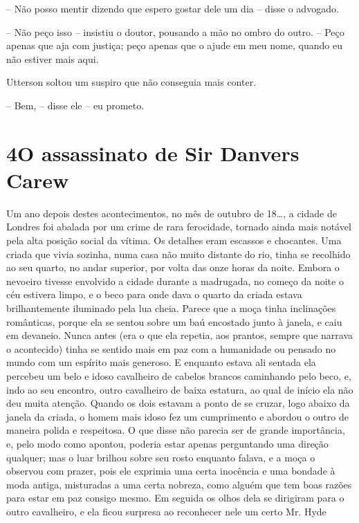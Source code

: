 -- Não posso mentir dizendo que espero gostar dele um dia -- disse o
advogado.

-- Não peço isso -- insistiu o doutor, pousando a mão no ombro do outro.
-- Peço apenas que aja com justiça; peço apenas que o ajude em meu nome,
quando eu não estiver mais aqui.

Utterson soltou um suspiro que não conseguia mais conter.

-- Bem, -- disse ele -- eu prometo.


\chapter[4 -- O assassinato de Sir Danvers Carew]{4\break O assassinato de Sir Danvers Carew}

Um ano depois destes acontecimentos, no mês de outubro de 18\ldots{}, a
cidade de Londres foi abalada por um crime de rara ferocidade, tornado
ainda mais notável pela alta posição social da vítima.  Os detalhes
eram escassos e chocantes.  Uma criada que vivia sozinha, numa casa não
muito distante do rio, tinha se recolhido ao seu quarto, no andar
superior, por volta das onze horas da noite.  Embora o nevoeiro tivesse
envolvido a cidade durante a madrugada, no começo da noite o céu
estivera limpo, e o beco para onde dava o quarto da criada estava
brilhantemente iluminado pela lua cheia.  Parece que a moça tinha
inclinações românticas, porque ela se sentou sobre um baú encostado
junto à janela, e caiu em devaneio.  Nunca antes (era o que ela
repetia, aos prantos, sempre que narrava o acontecido) tinha se sentido
mais em paz com a humanidade ou pensado no mundo com um espírito mais
generoso.  E enquanto estava ali sentada ela percebeu um belo e idoso
cavalheiro de cabelos brancos caminhando pelo beco, e, indo ao seu
encontro, outro cavalheiro de baixa estatura, ao qual de início ela não
deu muita atenção.  Quando os dois estavam a ponto de se cruzar, logo
abaixo da janela da criada, o homem mais idoso fez um cumprimento e
abordou o outro de maneira polida e respeitosa.  O que disse não
parecia ser de grande importância, e, pelo modo como apontou, poderia
estar apenas perguntando uma direção qualquer; mas o luar brilhou sobre
seu rosto enquanto falava, e a moça o observou com prazer, pois ele
exprimia uma certa inocência e uma bondade à moda antiga, misturadas a
uma certa nobreza, como alguém que tem boas razões para estar em paz
consigo mesmo.  Em seguida os olhos dela se dirigiram para o outro
cavalheiro, e ela ficou surpresa ao reconhecer nele um certo Mr. Hyde
